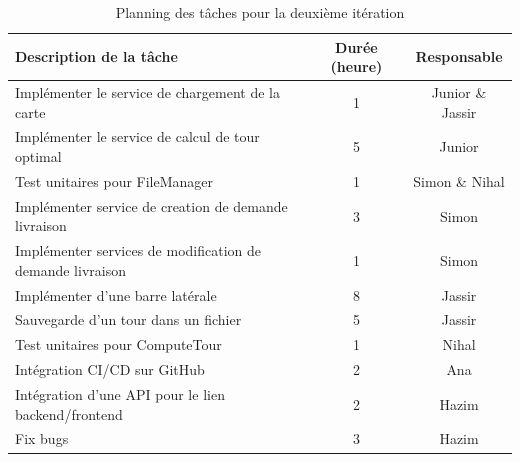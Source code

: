\documentclass[a4paper]{article}
\begin{document}
\begin{table}[H]
\centering
\begin{tabularx}{\textwidth}{|X|c|c|}
\hline
\textbf{Description de la tâche} & \textbf{Durée (heure)} & \textbf{Responsable} \\ \hline
Implémenter le service de chargement de la carte            & 1                     & Junior \& Jassir                \\ \hline
Implémenter le service de calcul de tour optimal & 5                     & Junior   \\ \hline
Test unitaires pour FileManager            & 1                     & Simon \& Nihal                 \\ \hline
Implémenter service de creation de demande livraison                           & 3                    & Simon                \\ \hline
Implémenter services de modification de demande livraison                          & 1                     & Simon             \\ \hline
Implémenter d'une barre latérale                          & 8                     & Jassir             \\ \hline
Sauvegarde d'un tour dans un fichier                          & 5                     & Jassir             \\ \hline
Test unitaires pour ComputeTour                          & 1                     & Nihal             \\ \hline
Intégration CI/CD sur GitHub                         & 2                     & Ana             \\ \hline
Intégration d'une API pour le lien backend/frontend                         & 2                     & Hazim             \\ \hline
Fix bugs                         & 3                     & Hazim             \\ \hline
\end{tabularx}
\caption{Planning des tâches pour la deuxième itération}
\end{table}
\end{document}
